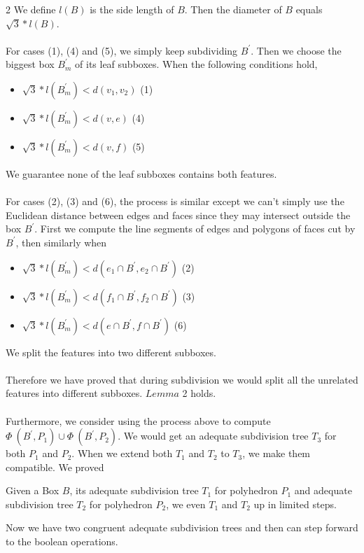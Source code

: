 \documentclass[twoside]{article}
\begin{document}
\begin{multicols}{2}
We define $l(B)$ is the side length of $B$. Then the diameter of $B$ equals $\sqrt{3} * l(B)$.
\\
\\
\indent For cases (1), (4) and (5), we simply keep subdividing $B^\prime$. Then we choose the biggest box $B_m^\prime$ of its leaf subboxes. When the following conditions hold, 
\begin{itemize}
\item $\sqrt{3} * l(B_m^\prime) < d(v_1,v_2)$ \hfill (1)
\item $\sqrt{3} * l(B_m^\prime) < d(v,e)$ \hfill (4)
\item $\sqrt{3} * l(B_m^\prime) < d(v,f)$ \hfill (5)
\end{itemize}
\indent We guarantee none of the leaf subboxes contains both features.
\\
\\
\indent For cases (2), (3) and (6), the process is similar except we can't simply use the Euclidean distance between edges and faces since they may intersect outside the box $B^\prime$. First we compute the line segments of edges and polygons of faces cut by $B^\prime$, then similarly when
 \begin{itemize}
 \item $\sqrt{3} * l(B_m^\prime) < d(e_1\cap B^\prime,e_2\cap B^\prime)$ \hfill (2)
 \item $\sqrt{3} * l(B_m^\prime) < d(f_1\cap B^\prime,f_2\cap B^\prime)$ \hfill (3)
 \item $\sqrt{3} * l(B_m^\prime) < d(e\cap B^\prime,f\cap B^\prime)$ \hfill (6)
 \end{itemize}
 
\indent We split the features into two different subboxes.
 \\
 \\
\indent Therefore we have proved that during subdivision we would split all the unrelated features into different subboxes. $Lemma$ 2 holds.
\\
\\
\indent Furthermore, we consider using the process above to compute $\Phi\ (B^\prime, P_1) \cup \Phi\ (B^\prime, P_2)$. We would get an adequate subdivision tree $T_3$ for both $P_1$ and $P_2$. When we extend both $T_1$ and $T_2$ to $T_3$, we make them compatible. We proved

\begin{lemma}
Given a Box $B$, its adequate subdivision tree $T_1$ for polyhedron $P_1$ and adequate subdivision tree $T_2$ for polyhedron $P_2$, we even $T_1$ and $T_2$ up in limited steps.
\end{lemma}
\indent Now we have two congruent adequate subdivision trees and then can step forward to the boolean operations.

\end{multicols}
\end{document}
